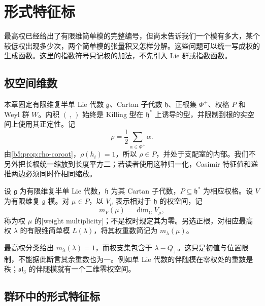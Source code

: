 %
%

\section{形式特征标}
\label{b5:sec:1901}

最高权已经给出了有限维简单模的完整编号，但尚未告诉我们一个模有多大，某个较低权出现多少次，两个简单模的张量积又怎样分解。这些问题可以统一写成权的生成函数。这里的指数符号只记权的加法，不先引入 Lie 群或指数函数。

\subsection{权空间维数}
\label{b5:subsec:1901:01}

本章固定有限维复半单 Lie 代数 \(\mathfrak g\)、Cartan 子代数 \(\mathfrak h\)、正根集 \(\Phi^+\)、权格 \(P\) 和 Weyl 群 \(W\)。内积 \((\, ,\,)\) 始终是 Killing 型在 \(\mathfrak h^*\) 上诱导的型，并限制到根的实空间上使用其正定性。记
\[
	\rho=\frac12\sum_{\alpha\in\Phi^+}\alpha.
\]
由\cref{b5:prop:rho-coroot}，\(\rho(h_i)=1\)，所以 \(\rho\in P\)，并处于支配室的内部。我们不另外把长根统一缩放到长度平方二；若读者使用这种归一化，Casimir 特征值和递推两边必须同时作相同缩放。

\begin{definition}\label{b5:def:weight-multiplicity}
	设 \(\mathfrak g\) 为有限维复半单 Lie 代数，\(\mathfrak h\) 为其 Cartan 子代数，\(P\subseteq\mathfrak h^*\) 为相应权格。设 \(V\) 为有限维复 \(\mathfrak g\) 模。对 \(\mu\in P\)，以 \(V_\mu\) 表示相对于 \(\mathfrak h\) 的权空间，记
	\[
		m_V(\mu)=\dim_{\mathbb C}V_\mu,
	\]
	称为权 \(\mu\) 的[weight multiplicity]；不是权时规定其为零。另选正根，对相应最高权 \(\lambda\) 的有限维简单模 \(L(\lambda)\)，将其权重数简记为 \(m_\lambda(\mu)\)。
\end{definition}

最高权分类给出 \(m_\lambda(\lambda)=1\)，而权支集包含于 \(\lambda-Q_+\)。这只是初值与位置限制，不能据此断言其余重数也为一。例如单 Lie 代数的伴随模在零权处的重数是秩；\(\mathfrak{sl}_3\) 的伴随模就有一个二维零权空间。

\subsection{群环中的形式特征标}
\label{b5:subsec:1901:02}

